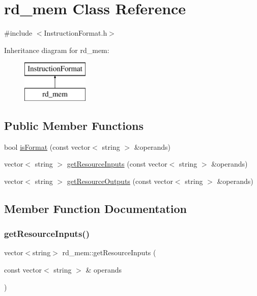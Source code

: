 \hypertarget{classrd__mem}{}\section{rd\+\_\+mem Class Reference}
\label{classrd__mem}


{\ttfamily \#include $<$Instruction\+Format.\+h$>$}

Inheritance diagram for rd\+\_\+mem\+:\begin{figure}[H]
\begin{center}
\leavevmode
\includegraphics[height=2.000000cm]{classrd__mem}
\end{center}
\end{figure}
\subsection*{Public Member Functions}
\begin{DoxyCompactItemize}
\item 
bool \hyperlink{classrd__mem_a1326e4c5e3a7f263d5dc850b0d32962f}{is\+Format} (const vector$<$ string $>$ \&operands)
\item 
vector$<$ string $>$ \hyperlink{classrd__mem_a0f3a8067b15d3a7a171c15e90b10f7f0}{get\+Resource\+Inputs} (const vector$<$ string $>$ \&operands)
\item 
vector$<$ string $>$ \hyperlink{classrd__mem_a84b92866d710443ed821459840541f53}{get\+Resource\+Outputs} (const vector$<$ string $>$ \&operands)
\end{DoxyCompactItemize}


\subsection{Member Function Documentation}
\mbox{\label{classrd__mem_a0f3a8067b15d3a7a171c15e90b10f7f0}} 
\subsubsection{\texorpdfstring{get\+Resource\+Inputs()}{getResourceInputs()}}
{\footnotesize\ttfamily vector$<$string$>$ rd\+\_\+mem\+::get\+Resource\+Inputs (\begin{DoxyParamCaption}\item[{const vector$<$ string $>$ \&}]{operands }\end{DoxyParamCaption})\hspace{0.3cm}{\ttfamily [virtual]}}

